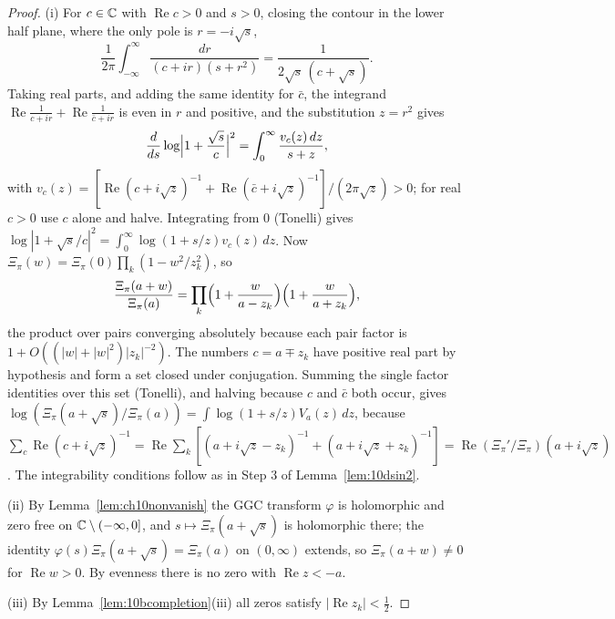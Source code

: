 \begin{proof}
(i) For $c\in\mathbb{C}$ with $\operatorname{Re}c>0$ and $s>0$, closing the contour in the lower half plane, where the only pole is $r = -i\sqrt s$,
\[
\frac1{2\pi}\int_{-\infty}^\infty\frac{dr}{(c+ir)(s+r^2)} = \frac1{2\sqrt s\,(c+\sqrt s)} .
\]
Taking real parts, and adding the same identity for $\bar c$, the integrand $\operatorname{Re}\frac1{c+ir}+\operatorname{Re}\frac1{\bar c+ir}$ is even in $r$ and positive, and the substitution $z = r^2$ gives
\[
\frac d{ds}\log\Bigl|1+\frac{\sqrt s}c\Bigr|^2 = \int_0^\infty\frac{v_c(z)\,dz}{s+z},
\]
with $v_c(z) = [\operatorname{Re}(c+i\sqrt z)^{-1}+\operatorname{Re}(\bar c+i\sqrt z)^{-1}]/(2\pi\sqrt z)>0$; for real $c>0$ use $c$ alone and halve. Integrating from $0$ (Tonelli) gives $\log|1+\sqrt s/c|^2 = \int_0^\infty\log(1+s/z)v_c(z)\,dz$. Now $\Xi_\pi(w) = \Xi_\pi(0)\prod_k(1-w^2/z_k^2)$, so
\[
\frac{\Xi_\pi(a+w)}{\Xi_\pi(a)} = \prod_k\Bigl(1+\frac w{a-z_k}\Bigr)\Bigl(1+\frac w{a+z_k}\Bigr),
\]
the product over pairs converging absolutely because each pair factor is $1+O((|w|+|w|^2)|z_k|^{-2})$. The numbers $c = a\mp z_k$ have positive real part by hypothesis and form a set closed under conjugation. Summing the single factor identities over this set (Tonelli), and halving because $c$ and $\bar c$ both occur, gives $\log(\Xi_\pi(a+\sqrt s)/\Xi_\pi(a)) = \int\log(1+s/z)V_a(z)\,dz$, because $\sum_c\operatorname{Re}(c+i\sqrt z)^{-1} = \operatorname{Re}\sum_k[(a+i\sqrt z-z_k)^{-1}+(a+i\sqrt z+z_k)^{-1}] = \operatorname{Re}(\Xi_\pi'/\Xi_\pi)(a+i\sqrt z)$. The integrability conditions follow as in Step 3 of Lemma~\ref{lem:10dsin2}.

(ii) By Lemma~\ref{lem:ch10nonvanish} the GGC transform $\varphi$ is holomorphic and zero free on $\mathbb{C}\setminus(-\infty,0]$, and $s\mapsto\Xi_\pi(a+\sqrt s)$ is holomorphic there; the identity $\varphi(s)\Xi_\pi(a+\sqrt s) = \Xi_\pi(a)$ on $(0,\infty)$ extends, so $\Xi_\pi(a+w)\ne0$ for $\operatorname{Re}w>0$. By evenness there is no zero with $\operatorname{Re}z<-a$.

(iii) By Lemma~\ref{lem:10bcompletion}(iii) all zeros satisfy $|\operatorname{Re}z_k|<\frac12$.


\end{proof}
